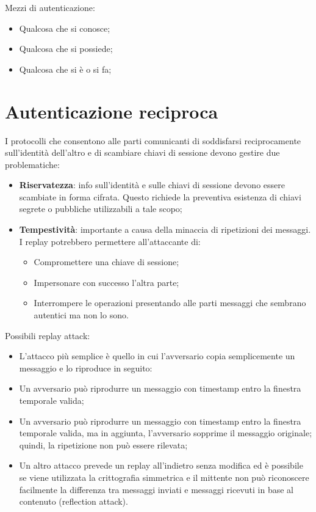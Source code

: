 Mezzi di autenticazione:
\begin{itemize}
    \item Qualcosa che si conosce;
	\item Qualcosa che si possiede;
	\item Qualcosa che si è o si fa;
\end{itemize}

\section{Autenticazione reciproca}
I protocolli che consentono alle parti comunicanti di soddisfarsi reciprocamente sull'identità dell'altro e di scambiare chiavi di sessione devono gestire due problematiche:
\begin{itemize}
    \item \textbf{Riservatezza}: info sull'identità e sulle chiavi di sessione devono essere scambiate in forma cifrata. Questo richiede la preventiva esistenza di chiavi segrete o pubbliche utilizzabili a tale scopo;
	\item \textbf{Tempestività}: importante a causa della minaccia di ripetizioni dei messaggi. I replay potrebbero permettere all'attaccante di:
	\begin{itemize}
	    \item Compromettere una chiave di sessione;
		\item Impersonare con successo l'altra parte;
		\item Interrompere le operazioni presentando alle parti messaggi che sembrano autentici ma non lo sono.
	\end{itemize}
\end{itemize}

Possibili replay attack:
\begin{itemize}
    \item L'attacco più semplice è quello in cui l'avversario copia semplicemente un messaggio e lo riproduce in seguito:
	\item Un avversario può riprodurre un messaggio con timestamp entro la finestra temporale valida;
	\item Un avversario può riprodurre un messaggio con timestamp entro la finestra temporale valida, ma in aggiunta, l'avversario sopprime il messaggio originale; quindi, la ripetizione non può essere rilevata;
	\item Un altro attacco prevede un replay all'indietro senza modifica ed è possibile se viene utilizzata la crittografia simmetrica e il mittente non può riconoscere facilmente la differenza tra messaggi inviati e messaggi ricevuti in base al contenuto (reflection attack).
\end{itemize}

